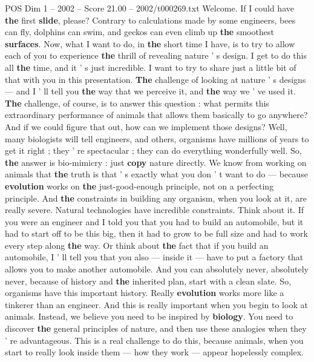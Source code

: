 \begin{textsample}{POS Dim 1 – 2002 – Score 21.00 – 2002/t000269.txt}  \label{ex:f1_pos_019}
Welcome.
If I could have \textbf{the} first \textbf{slide}, please?
Contrary to calculations made by some engineers, bees can fly, dolphins can swim, and geckos can even climb up \textbf{the} smoothest \textbf{surfaces}.
Now, what I want to do, in \textbf{the} short time I have, is to try to allow each of you to experience \textbf{the} thrill of revealing nature ' s design.
I get to do this all \textbf{the} time, and it ' s just incredible.
I want to try to share just a little bit of that with you in this presentation. \textbf{The} challenge of looking at nature ' s designs — and I ' ll tell you \textbf{the} way that we perceive it, and \textbf{the} way we ' ve used it. \textbf{The} challenge, of course, is to answer this question : what permits this extraordinary performance of animals that allows them basically to go anywhere?
And if we could figure that out, how can we implement those designs?
Well, many biologists will tell engineers, and others, organisms have millions of years to get it right ; they ' re spectacular ; they can do everything wonderfully well.
So, \textbf{the} answer is bio-mimicry : just \textbf{copy} nature directly.
We know from working on animals that \textbf{the} truth is that ' s exactly what you don ' t want to do — because \textbf{evolution} works on \textbf{the} just-good-enough principle, not on a perfecting principle.
And \textbf{the} constraints in building any organism, when you look at it, are really severe.
Natural technologies have incredible constraints.
Think about it.
If you were an engineer and I told you that you had to build an automobile, but it had to start off to be this big, then it had to grow to be full size and had to work every step along \textbf{the} way.
Or think about \textbf{the} fact that if you build an automobile, I ' ll tell you that you also — inside it — have to put a factory that allows you to make another automobile.
And you can absolutely never, absolutely never, because of history and \textbf{the} inherited plan, start with a clean slate.
So, organisms have this important history.
Really \textbf{evolution} works more like a tinkerer than an engineer.
And this is really important when you begin to look at animals.
Instead, we believe you need to be inspired by \textbf{biology}.
You need to discover \textbf{the} general principles of nature, and then use these analogies when they ' re advantageous.
This is a real challenge to do this, because animals, when you start to really look inside them — how they work — appear hopelessly complex.

\end{textsample}
